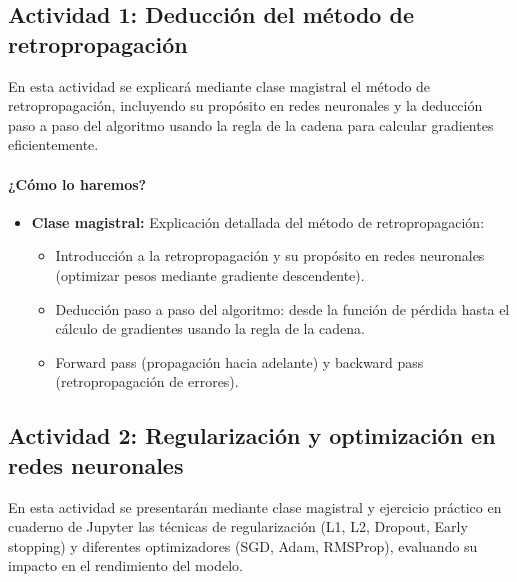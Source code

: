 \documentclass[a4,11pt]{aleph-notas}
\begin{document}
\subsection*{Actividad 1: Deducción del método de retropropagación}

En esta actividad se explicará mediante clase magistral el método de retropropagación, incluyendo su propósito en redes neuronales y la deducción paso a paso del algoritmo usando la regla de la cadena para calcular gradientes eficientemente.

\paragraph{¿Cómo lo haremos?}
\begin{itemize}[leftmargin=*]
    \item \textbf{Clase magistral:}
    Explicación detallada del método de retropropagación:
    \begin{itemize}
        \item Introducción a la retropropagación y su propósito en redes neuronales (optimizar pesos mediante gradiente descendente).
        \item Deducción paso a paso del algoritmo: desde la función de pérdida hasta el cálculo de gradientes usando la regla de la cadena.
        \item Forward pass (propagación hacia adelante) y backward pass (retropropagación de errores).
    \end{itemize}
   
\end{itemize}

\subsection*{Actividad 2: Regularización y optimización en redes neuronales}

En esta actividad se presentarán mediante clase magistral y ejercicio práctico en cuaderno de Jupyter las técnicas de regularización (L1, L2, Dropout, Early stopping) y diferentes optimizadores (SGD, Adam, RMSProp), evaluando su impacto en el rendimiento del modelo.
\end{document}
